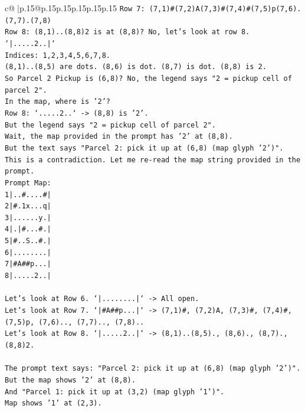\documentclass{article}
\begin{document}
{\begin{supertabular}{c@{$\;$}|p{.15\linewidth}@{}p{.15\linewidth}p{.15\linewidth}p{.15\linewidth}p{.15\linewidth}p{.15\linewidth}}
{{{\texttt{Row 7: (7,1)\#(7,2)A(7,3)\#(7,4)\#(7,5)p(7,6).(7,7).(7,8)} \\
\texttt{Row 8: (8,1)..(8,8)2 is at (8,8)? No, let's look at row 8. `|.....2..|`} \\
\texttt{Indices: 1,2,3,4,5,6,7,8.} \\
\texttt{(8,1)..(8,5) are dots. (8,6) is dot. (8,7) is dot. (8,8) is 2.} \\
\texttt{So Parcel 2 Pickup is (6,8)? No, the legend says "2 = pickup cell of parcel 2".} \\
\texttt{In the map, where is '2'?} \\
\texttt{Row 8: `.....2..` {-}> (8,8) is '2'.} \\
\texttt{But the legend says "2 = pickup cell of parcel 2".} \\
\texttt{Wait, the map provided in the prompt has '2' at (8,8).} \\
\texttt{But the text says "Parcel 2: pick it up at (6,8) (map glyph '2')".} \\
\texttt{This is a contradiction. Let me re{-}read the map string provided in the prompt.} \\
\texttt{Prompt Map:} \\
\texttt{1|..\#....\#|} \\
\texttt{2|\#.1x...q|} \\
\texttt{3|......y.|} \\
\texttt{4|.|\#...\#.|} \\
\texttt{5|\#..S..\#.|} \\
\texttt{6|........|} \\
\texttt{7|\#A\#\#p...|} \\
\texttt{8|.....2..|} \\
\\ 
\texttt{Let's look at Row 6. `|........|` {-}> All open.} \\
\texttt{Let's look at Row 7. `|\#A\#\#p...|` {-}> (7,1)\#, (7,2)A, (7,3)\#, (7,4)\#, (7,5)p, (7,6).., (7,7).., (7,8)..} \\
\texttt{Let's look at Row 8. `|.....2..|` {-}> (8,1)..(8,5)., (8,6)., (8,7)., (8,8)2.} \\
\\ 
\texttt{The prompt text says: "Parcel 2: pick it up at (6,8) (map glyph '2')".} \\
\texttt{But the map shows '2' at (8,8).} \\
\texttt{And "Parcel 1: pick it up at (3,2) (map glyph '1')".} \\
\texttt{Map shows '1' at (2,3).} \\
}}}
\end{supertabular}}
\end{document}

